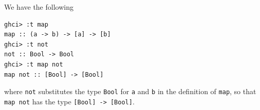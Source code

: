 We have the following
\begin{lstlisting}
ghci> :t map
map :: (a -> b) -> [a] -> [b]
ghci> :t not
not :: Bool -> Bool
ghci> :t map not
map not :: [Bool] -> [Bool]
\end{lstlisting}
where \verb|not| substitutes the type \verb|Bool| for \verb|a| and \verb|b| in the 
definition of \verb|map|, so that \verb|map not| has the type \verb|[Bool] -> [Bool]|.
